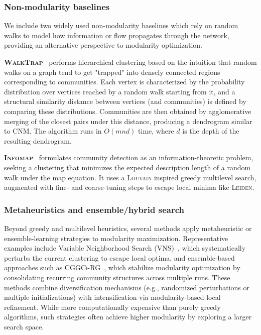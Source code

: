 \documentclass[../paper.tex]{subfiles}
\begin{document}
\subsubsection{Non-modularity baselines}

We include two widely used non-modularity baselines which rely on random walks to model how information or flow propagates through the network, providing an alternative perspective to modularity optimization.

\textbf{\textsc{WalkTrap}}~\cite{walktrap2005} performs hierarchical clustering based on the intuition that random walks on a graph tend to get "trapped" into densely connected regions corresponding to communities. 
Each vertex is characterized by the probability distribution over vertices reached by a random walk starting from it, and a structural similarity distance between vertices (and communities) is defined by comparing these distributions. Communities are then obtained by agglomerative merging of the closest pairs under this distance, producing a dendrogram similar to \textsc{CNM}. The algorithm runs in $O(m n d)$ time, where $d$ is the depth of the resulting dendrogram.

\textbf{\textsc{Infomap}}~\cite{infomap2008} formulates community detection as an information-theoretic problem, seeking a clustering that minimizes the expected description length of a random walk under the map equation.
It uses a \textsc{Louvain} inspired greedy multilevel search, augmented with fine- and coarse-tuning steps to escape local minima like \textsc{Leiden}.

\subsubsection{Metaheuristics and ensemble/hybrid search}

Beyond greedy and multilevel heuristics, several methods apply metaheuristic or ensemble-learning strategies to modularity maximization.
Representative examples include Variable Neighborhood Search (\textsc{VNS})~\cite{vns2012}, which systematically perturbs the current clustering to escape local optima, and ensemble-based approaches such as \textsc{CGGCi-RG}~\cite{cggci_rg2012}, which stabilize modularity optimization by consolidating recurring community structures across multiple runs.
These methods combine diversification mechanisms (e.g., randomized perturbations or multiple initializations) with intensification via modularity-based local refinement.
While more computationally expensive than purely greedy algorithms, such strategies often achieve higher modularity by exploring a larger search space.
\end{document}
